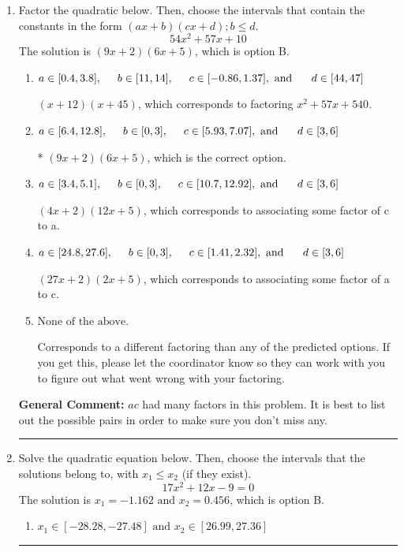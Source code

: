 \documentclass{extbook}[14pt]
\newcommand{\litem}[1]{\item #1

\rule{\textwidth}{0.4pt}}
\begin{document}
\begin{enumerate}\litem{
Factor the quadratic below. Then, choose the intervals that contain the constants in the form $(ax+b)(cx+d); b \leq d.$
\[ 54x^{2} +57 x + 10 \]
The solution is \( (9x + 2)(6x + 5) \), which is option B.\begin{enumerate}[label=\Alph*.]
\item \( a \in [0.4, 3.8], \hspace*{5mm} b \in [11, 14], \hspace*{5mm} c \in [-0.86, 1.37], \text{ and } \hspace*{5mm} d \in [44, 47] \)

 $(x + 12)(x + 45)$, which corresponds to factoring $x^{2} +57 x + 540$.
\item \( a \in [6.4, 12.8], \hspace*{5mm} b \in [0, 3], \hspace*{5mm} c \in [5.93, 7.07], \text{ and } \hspace*{5mm} d \in [3, 6] \)

* $(9x + 2)(6x + 5)$, which is the correct option.
\item \( a \in [3.4, 5.1], \hspace*{5mm} b \in [0, 3], \hspace*{5mm} c \in [10.7, 12.92], \text{ and } \hspace*{5mm} d \in [3, 6] \)

 $(4x + 2)(12x + 5)$, which corresponds to associating some factor of c to a.
\item \( a \in [24.8, 27.6], \hspace*{5mm} b \in [0, 3], \hspace*{5mm} c \in [1.41, 2.32], \text{ and } \hspace*{5mm} d \in [3, 6] \)

 $(27x + 2)(2x + 5)$, which corresponds to associating some factor of a to c.
\item \( \text{None of the above.} \)

 Corresponds to a different factoring than any of the predicted options. If you get this, please let the coordinator know so they can work with you to figure out what went wrong with your factoring.
\end{enumerate}

\textbf{General Comment:} $ac$ had many factors in this problem. It is best to list out the possible pairs in order to make sure you don't miss any.
}
\litem{
Solve the quadratic equation below. Then, choose the intervals that the solutions belong to, with $x_1 \leq x_2$ (if they exist).
\[ 17x^{2} +12 x -9 = 0 \]
The solution is \( x_1 = -1.162 \text{ and } x_2 = 0.456 \), which is option B.\begin{enumerate}[label=\Alph*.]
\item \( x_1 \in [-28.28, -27.48] \text{ and } x_2 \in [26.99, 27.36] \)


\end{enumerate}}
\end{enumerate}
\end{document}
